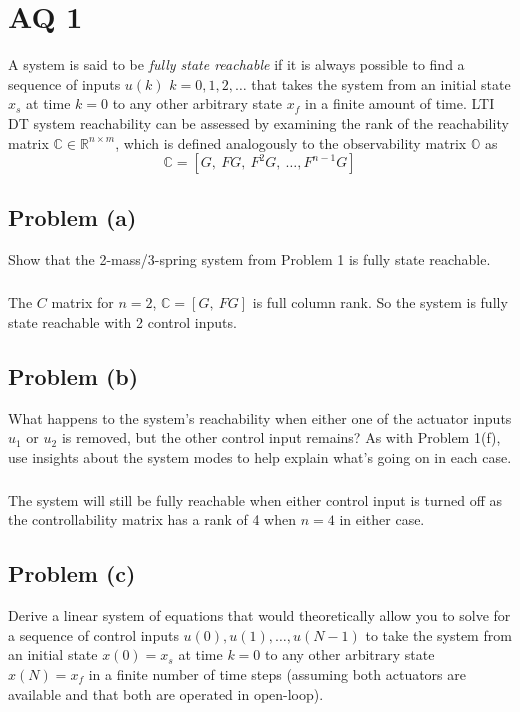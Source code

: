 \documentclass[11pt]{article}
\begin{document}
\section*{AQ 1}
A system is said to be \textit{fully state reachable} if it is always possible to find a sequence of inputs $u(k)$ $k=0,1,2,\dots$ that takes the system from an initial state $x_s$ at time $k=0$ to any other arbitrary state $x_f$ in a finite amount of time. LTI DT system reachability can be assessed by examining the rank of the reachability matrix $\mathbb{C} \in \mathbb{R}^{n\times m}$, which is defined analogously to the observability matrix $\mathbb{O}$ as 
\begin{equation*}
	\mathbb{C} = [G,\ FG,\ F^2G,\ \dots, F^{n-1}G]
\end{equation*}

\subsection*{Problem (a)}
Show that the 2-mass/3-spring system from Problem 1 is fully state reachable.

\subparagraph*{}
The $C$ matrix for $n=2$, $\mathbb{C}=[G,\ FG]$ is full column rank. So the system is fully state reachable with 2 control inputs.

\subsection*{Problem (b)}
What happens to the system's reachability when either one of the actuator inputs $u_1$ or $u_2$ is removed, but the other control input remains? As with Problem 1(f), use insights about the system modes to help explain what's going on in each case.

\subparagraph*{}
The system will still be fully reachable when either control input is turned off as the controllability matrix has a rank of 4 when $n=4$ in either case. 

\subsection*{Problem (c)}
Derive a linear system of equations that would theoretically allow you to solve for a sequence of control inputs $u(0),u(1),\dots,u(N-1)$ to take the system from an initial state $x(0)=x_s$ at time $k=0$ to any other arbitrary state $x(N)=x_f$ in a finite number of time steps (assuming both actuators are available and that both are operated in open-loop).
\end{document}
